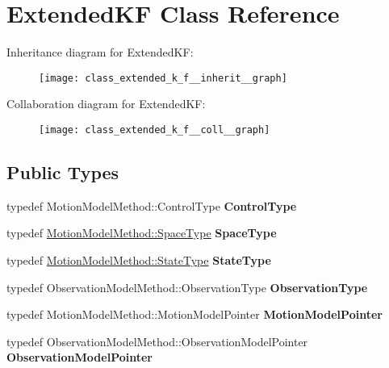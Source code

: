\hypertarget{class_extended_k_f}{\section{\-Extended\-K\-F \-Class \-Reference}
\label{class_extended_k_f}
}


\-Inheritance diagram for \-Extended\-K\-F\-:\nopagebreak
\begin{figure}[H]
\begin{center}
\leavevmode
\texttt{[image: class\_extended\_k\_f\_\_inherit\_\_graph]}
\end{center}
\end{figure}


\-Collaboration diagram for \-Extended\-K\-F\-:\nopagebreak
\begin{figure}[H]
\begin{center}
\leavevmode
\texttt{[image: class\_extended\_k\_f\_\_coll\_\_graph]}
\end{center}
\end{figure}
\subsection*{\-Public \-Types}
\begin{DoxyCompactItemize}
\item 
\hypertarget{class_extended_k_f_a14edd0da9fb8029c87fb0206490e10b3}{typedef \*
\-Motion\-Model\-Method\-::\-Control\-Type {\bfseries \-Control\-Type}}\label{class_extended_k_f_a14edd0da9fb8029c87fb0206490e10b3}

\item 
\hypertarget{class_extended_k_f_a577b350233488edad44145be188b8838}{typedef \*
\hyperlink{class_s_e2_belief_space}{\-Motion\-Model\-Method\-::\-Space\-Type} {\bfseries \-Space\-Type}}\label{class_extended_k_f_a577b350233488edad44145be188b8838}

\item 
\hypertarget{class_extended_k_f_a390468694f87826805dc6b97e37da8ea}{typedef \*
\hyperlink{class_s_e2_belief_space_1_1_state_type}{\-Motion\-Model\-Method\-::\-State\-Type} {\bfseries \-State\-Type}}\label{class_extended_k_f_a390468694f87826805dc6b97e37da8ea}

\item 
\hypertarget{class_extended_k_f_a77ebe1a32d7ec95c8cda310ad4623e8e}{typedef \*
\-Observation\-Model\-Method\-::\-Observation\-Type {\bfseries \-Observation\-Type}}\label{class_extended_k_f_a77ebe1a32d7ec95c8cda310ad4623e8e}

\item 
\hypertarget{class_extended_k_f_a0c9bb13d2de00dd93f574d6387840441}{typedef \*
\-Motion\-Model\-Method\-::\-Motion\-Model\-Pointer {\bfseries \-Motion\-Model\-Pointer}}\label{class_extended_k_f_a0c9bb13d2de00dd93f574d6387840441}

\item 
\hypertarget{class_extended_k_f_aa60b08c63627ba5ddedd2a51b573718d}{typedef \*
\-Observation\-Model\-Method\-::\-Observation\-Model\-Pointer {\bfseries \-Observation\-Model\-Pointer}}\label{class_extended_k_f_aa60b08c63627ba5ddedd2a51b573718d}

\end{DoxyCompactItemize}
